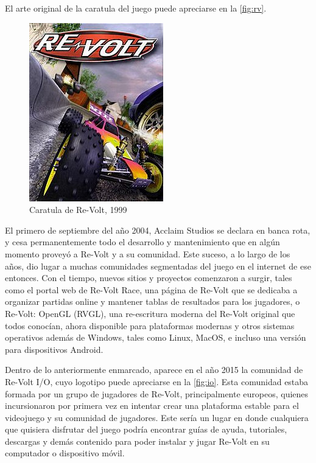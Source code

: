 El arte original de la caratula del juego puede apreciarse en la \autoref{fig:rv}.

\begin{figure}[H]
  \begin{center}
    \includegraphics{img/re-volt.jpg}
  \end{center}
  \caption[Caratula de Re-Volt, 1999]{Caratula de Re-Volt, 1999}
  \label{fig:rv}
\end{figure}

El primero de septiembre del año 2004, Acclaim Studios se declara en banca rota, y cesa permanentemente todo el desarrollo y mantenimiento que en algún momento proveyó a Re-Volt y a su comunidad. Este suceso, a lo largo de los años, dio lugar a muchas comunidades segmentadas del juego en el internet de ese entonces. Con el tiempo, nuevos sitios y proyectos comenzaron a surgir, tales como el portal web de Re-Volt Race, una página de Re-Volt que se dedicaba a organizar partidas online y mantener tablas de resultados para los jugadores, o Re-Volt: OpenGL (RVGL), una re-escritura moderna del Re-Volt original que todos conocían, ahora disponible para plataformas modernas y otros sistemas operativos además de Windows, tales como Linux, MacOS, e incluso una versión para dispositivos Android.

Dentro de lo anteriormente enmarcado, aparece en el año 2015 la comunidad de Re-Volt I/O, cuyo logotipo puede apreciarse en la \autoref{fig:io}. Esta comunidad estaba formada por un grupo de jugadores de Re-Volt, principalmente europeos, quienes incursionaron por primera vez en intentar crear una plataforma estable para el videojuego y su comunidad de jugadores. Este sería un lugar en donde cualquiera que quisiera disfrutar del juego podría encontrar guías de ayuda, tutoriales, descargas y demás contenido para poder instalar y jugar Re-Volt en su computador o dispositivo móvil.

